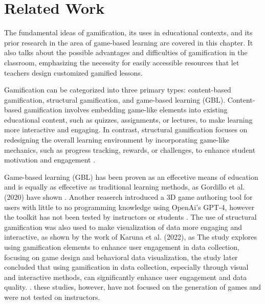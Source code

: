 \chapter{Related Work}\label{chap:relatedwork}
The fundamental ideas of gamification, its uses in educational contexts, and its prior research in the area of game-based learning are covered in this chapter. It also talks about the possible advantages and difficulties of gamification in the classroom, emphasizing the necessity for easily accessible resources that let teachers design customized gamified lessons.

Gamification can be categorized into three primary types: content-based gamification, structural gamification, and game-based learning (GBL). Content-based gamification involves embedding game-like elements into existing educational content, such as quizzes, assignments, or lectures, to make learning more interactive and engaging. In contrast, structural gamification focuses on redesigning the overall learning environment by incorporating game-like mechanics, such as progress tracking, rewards, or challenges, to enhance student motivation and engagement \cite{fernando2024}.

Game-based learning (GBL) has been proven as an effecetive means of education and is equally as effecetive as traditional learning methods, as Gordillo et al. (2020) have shown \cite{sgame2020}. Another reaserch introduced a 3D game authoring tool for users with little to no programming knowledge using OpenAi's GPT-4, however the toolkit has not been tested by instructors or students \cite{horn2023}. The use of structural gamification was also used to make visualization of data more engaging and interactive, as shown by the work of Karuna et al. (2022), as The study explores using gamification elements to enhance user engagement in data collection, focusing on game design and behavioral data visualization, the study later  concluded that using gamification in data collection, especially through visual and interactive methods, can significantly enhance user engagement and data quality. \cite{karuna2019}. these studies, however, have not focused on the generation of games and were not tested on instructors.


